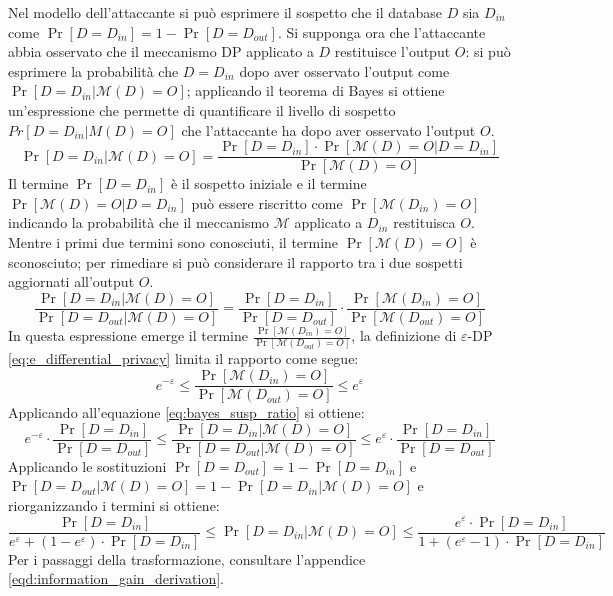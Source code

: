 Nel modello dell'attaccante si può esprimere il sospetto che il database $D$ sia $D_{in}$ come $\Pr[D = D_{in}] = 1 - \Pr[D = D_{out}]$. Si supponga ora che l'attaccante abbia osservato che il meccanismo DP applicato a $D$ restituisce l'output $O$: si può esprimere la probabilità che $D = D_{in}$ dopo aver osservato l'output come $\Pr[D = D_{in} | \mathcal{M}(D) = O]$; applicando il teorema di Bayes si ottiene un'espressione che permette di quantificare il livello di sospetto $Pr[D = D_{in}|M(D) = O]$ che l'attaccante ha dopo aver osservato l'output $O$.
\begin{equation}
\label{eq:bayes_susp}
    \Pr[D = D_{in} | \mathcal{M}(D) = O] = \frac{\Pr[D = D_{in}] \cdot \Pr[\mathcal{M}(D) = O | D = D_{in}]}{\Pr[\mathcal{M}(D) = O]}
\end{equation}
Il termine $\Pr[D = D_{in}]$ è il sospetto iniziale e il termine $\Pr[\mathcal{M}(D) = O | D = D_{in}]$ può essere riscritto come $\Pr[\mathcal{M}(D_{in}) = O]$ indicando la probabilità che il meccanismo $\mathcal{M}$ applicato a $D_{in}$ restituisca $O$. Mentre i primi due termini sono conosciuti, il termine $\Pr[\mathcal{M}(D) = O]$ è sconosciuto; per rimediare si può considerare il rapporto tra i due sospetti aggiornati all'output $O$.
\begin{equation}
\label{eq:bayes_susp_ratio}
    \frac{\Pr[D = D_{in} | \mathcal{M}(D) = O]}{\Pr[D = D_{out} | \mathcal{M}(D) = O]} = \frac{\Pr[D = D_{in}]}{\Pr[D = D_{out}]} \cdot \frac{\Pr[\mathcal{M}(D_{in}) = O]}{\Pr[\mathcal{M}(D_{out}) = O]}
\end{equation}
In questa espressione emerge il termine $\frac{\Pr[\mathcal{M}(D_{in}) = O]}{\Pr[\mathcal{M}(D_{out}) = O]}$, la definizione di $\varepsilon$-DP \eqref{eq:e_differential_privacy} limita il rapporto come segue:
\begin{equation}
\label{eq:e_dp_bounds}
    e^{-\varepsilon} \le \frac{\Pr[\mathcal{M}(D_{in}) = O]}{\Pr[\mathcal{M}(D_{out}) = O]} \le e^{\varepsilon}
\end{equation}
Applicando all'equazione \eqref{eq:bayes_susp_ratio} si ottiene:
\begin{equation}
\label{eq:mid_information_gain}
    e^{-\varepsilon} \cdot \frac{\Pr[D = D_{in}]}{\Pr[D = D_{out}]} \le \frac{\Pr[D = D_{in} | \mathcal{M}(D) = O]}{\Pr[D = D_{out} | \mathcal{M}(D) = O]} \le e^{\varepsilon} \cdot \frac{\Pr[D = D_{in}]}{\Pr[D = D_{out}]} 
\end{equation}
Applicando le sostituzioni $\Pr[D = D_{out}] = 1 - \Pr[D = D_{in}]$ e $\Pr[D = D_{out} | \mathcal{M}(D) = O] = 1 - \Pr[D = D_{in} | \mathcal{M}(D) = O]$ e riorganizzando i termini si ottiene:
\begin{equation}
\label{eq:information_gain}
    \frac{\Pr[D = D_{in}]}{e^\varepsilon + (1 - e^\varepsilon) \cdot \Pr[D = D_{in}]} \le \Pr[D = D_{in} | \mathcal{M}(D) = O] \le \frac{e^\varepsilon \cdot \Pr[D = D_{in}]}{1 + (e^\varepsilon - 1) \cdot \Pr[D = D_{in}]}
\end{equation}
Per i passaggi della trasformazione, consultare l'appendice \ref{eqd:information_gain_derivation}.

